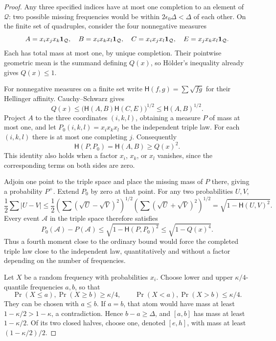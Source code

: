 \begin{proof}
Any three specified indices have at most one completion to an element of
\(\mathcal Q\): two possible missing frequencies would be within
\(2\epsilon_0\Delta<\Delta\) of each other.  On the finite set of
quadruples, consider the four nonnegative measures
\[
 A=x_i x_j x_k\mathbf 1_{\mathcal Q},\quad
 B=x_i x_k x_l\mathbf 1_{\mathcal Q},\quad
 C=x_i x_j x_l\mathbf 1_{\mathcal Q},\quad
 E=x_j x_k x_l\mathbf 1_{\mathcal Q}.
\]
Each has total mass at most one, by unique completion.  Their pointwise
geometric mean is the summand defining \(Q(x)\), so H\"older's inequality
already gives \(Q(x)\le1\).

For nonnegative measures on a finite set write
\(\mathsf H(f,g)=\sum\sqrt{fg}\) for their Hellinger affinity.
Cauchy--Schwarz gives
\begin{equation}
 Q(x)\le
       \bigl(\mathsf H(A,B)\mathsf H(C,E)\bigr)^{1/2}
       \le \mathsf H(A,B)^{1/2}.
 \label{phase:affinity-lower-bound}
\end{equation}
Project \(A\) to the three coordinates \((i,k,l)\), obtaining a measure
\(P\) of mass at most one, and let
\(P_0(i,k,l)=x_i x_k x_l\) be the independent triple law.
For each \((i,k,l)\) there is at most one completing \(j\).  Consequently
\begin{equation}
 \mathsf H(P,P_0)=\mathsf H(A,B)\ge Q(x)^2.
 \label{phase:projected-affinity}
\end{equation}
This identity also holds when a factor \(x_i\), \(x_k\), or \(x_l\)
vanishes, since the corresponding terms on both sides are zero.

Adjoin one point to the triple space and place the missing mass of \(P\)
there, giving a probability \(P^+\).  Extend \(P_0\) by zero at that
point.  For any two probabilities \(U,V\),
\[
 \frac12\sum |U-V|
 \le \frac12
       \left(\sum(\sqrt U-\sqrt V)^2\right)^{1/2}
       \left(\sum(\sqrt U+\sqrt V)^2\right)^{1/2}
 =\sqrt{1-\mathsf H(U,V)^2}.
\]
Every event \(\mathcal A\) in the triple space therefore satisfies
\begin{equation}
 P_0(\mathcal A)-P(\mathcal A)
 \le \sqrt{1-\mathsf H(P,P_0)^2}
 \le \sqrt{1-Q(x)^4}.
 \label{phase:event-deficit-upper}
\end{equation}
Thus a fourth moment close to the ordinary bound would force the
completed triple law close to the independent law, quantitatively and
without a factor depending on the number of frequencies.

Let \(X\) be a random frequency with probabilities \(x_i\).
Choose lower and upper \(\kappa/4\)-quantile frequencies \(a,b\), so that
\[
 \Pr(X\le a),\Pr(X\ge b)\ge\kappa/4,
 \qquad
 \Pr(X<a),\Pr(X>b)\le\kappa/4.
\]
They can be chosen with \(a\le b\).  If \(a=b\), that atom would have
mass at least \(1-\kappa/2>1-\kappa\), a contradiction.  Hence
\(b-a\ge\Delta\), and \([a,b]\) has mass at least \(1-\kappa/2\).
Of its two closed halves, choose one, denoted \([e,h]\), with mass at
least \((1-\kappa/2)/2\).


\end{proof}
